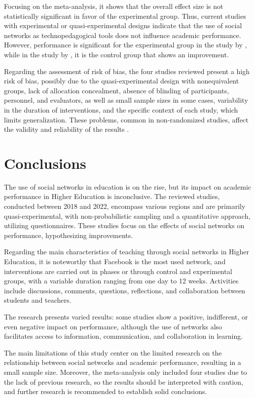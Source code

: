\documentclass[english]{textolivre}
\begin{document}
Focusing on the meta-analysis, it shows that the overall effect size is not statistically significant in favor of the experimental group. Thus, current studies with experimental or quasi-experimental designs indicate that the use of social networks as technopedagogical tools does not influence academic performance. However, performance is significant for the experimental group in the study by \textcite{demirbilek2018}, while in the study by \textcite{salasrueda2019}, it is the control group that shows an improvement.

Regarding the assessment of risk of bias, the four studies reviewed present a high risk of bias, possibly due to the quasi-experimental design with nonequivalent groups, lack of allocation concealment, absence of blinding of participants, personnel, and evaluators, as well as small sample sizes in some cases, variability in the duration of interventions, and the specific context of each study, which limits generalization. These problems, common in non-randomized studies, affect the validity and reliability of the results \cite{villarrealescorcia2021}.

\section{Conclusions}
The use of social networks in education is on the rise, but its impact on academic performance in Higher Education is inconclusive. The reviewed studies, conducted between 2018 and 2022, encompass various regions and are primarily quasi-experimental, with non-probabilistic sampling and a quantitative approach, utilizing questionnaires. These studies focus on the effects of social networks on performance, hypothesizing improvements.

Regarding the main characteristics of teaching through social networks in Higher Education, it is noteworthy that Facebook is the most used network, and interventions are carried out in phases or through control and experimental groups, with a variable duration ranging from one day to 12 weeks. Activities include discussions, comments, questions, reflections, and collaboration between students and teachers.

The research presents varied results: some studies show a positive, indifferent, or even negative impact on performance, although the use of networks also facilitates access to information, communication, and collaboration in learning.

The main limitations of this study center on the limited research on the relationship between social networks and academic performance, resulting in a small sample size. Moreover, the meta-analysis only included four studies due to the lack of previous research, so the results should be interpreted with caution, and further research is recommended to establish solid conclusions.
\end{document}
